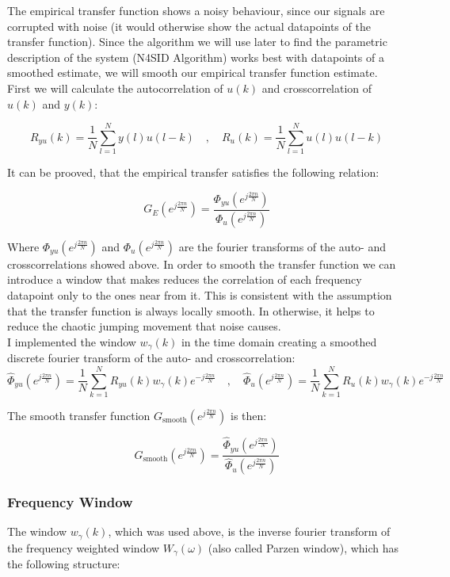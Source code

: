 The empirical transfer function shows a noisy behaviour, since our signals are corrupted with noise (it would otherwise show the actual datapoints of the transfer function). Since the algorithm we will use later to find the parametric description of the system (N4SID Algorithm) works best with datapoints of a smoothed estimate, we will smooth our empirical transfer function estimate.\\

First we will calculate the autocorrelation of $u(k)$ and crosscorrelation of $u(k)$ and $y(k)$:

\[R_{yu}(k) = \frac{1}{N}\sum\limits_{l = 1}^N y(l)u(l-k) \quad , \quad R_{u}(k) = \frac{1}{N}\sum\limits_{l = 1}^N u(l)u(l-k)\]

It can be prooved, that the empirical transfer satisfies the following relation: 

 \[G_E(e^{j\frac{2\pi n}{N}}) = \frac{\Phi_{yu}(e^{j\frac{2\pi n}{N}})}{\Phi_{u}(e^{j\frac{2\pi n}{N}})}\]

Where $\Phi_{yu}(e^{j\frac{2\pi n}{N}})$ and $\Phi_{u}(e^{j\frac{2\pi n}{N}})$ are the fourier transforms of the auto- and crosscorrelations showed above. In order to smooth the transfer function we can introduce a window that makes reduces the correlation of each frequency datapoint only to the ones near from it. This is consistent with the assumption that the transfer function is always locally smooth. In otherwise, it helps to reduce the chaotic jumping movement that noise causes. \\

I implemented the window $w_\gamma(k)$ in the time domain creating a smoothed discrete fourier transform of the auto- and crosscorrelation:
\[\hat{\Phi}_{yu}(e^{j\frac{2\pi n}{N}}) = \frac{1}{N}\sum\limits_{k = 1}^{N }R_{yu}(k)w_\gamma(k)e^{-j\frac{2\pi n}{N}} \quad, \quad \hat{\Phi}_{u}(e^{j\frac{2\pi n}{N}}) = \frac{1}{N}\sum\limits_{k = 1}^{N }R_{u}(k)w_\gamma(k)e^{-j\frac{2\pi n}{N}}\]

The smooth transfer function $G_\text{smooth}(e^{j\frac{2\pi n}{N}})$ is then:


 \[G_\text{smooth}(e^{j\frac{2\pi n}{N}}) = \frac{\hat{\Phi}_{yu}(e^{j\frac{2\pi n}{N}})}{\hat{\Phi}_{u}(e^{j\frac{2\pi n}{N}})}\]


\subsubsection{Frequency Window}

The window $w_\gamma(k)$, which was used above, is the inverse fourier transform of the frequency weighted window $W_\gamma(\omega)$ (also called Parzen window), which has the following structure:

